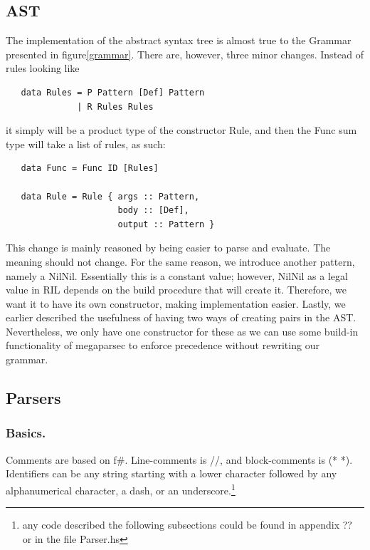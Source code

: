 \documentclass[a4paper]{article}
\begin{document}
\subsection{AST}
\label{sec:org0b11442}
The implementation of the abstract syntax tree is almost true to the Grammar presented in figure\ref{grammar}. There are, however, three minor changes. Instead of rules looking like
\begin{verbatim}
   data Rules = P Pattern [Def] Pattern
              | R Rules Rules
\end{verbatim}
it simply will be a product type of the constructor Rule, and then the Func sum type will take a list of rules, as such:
\begin{verbatim}
   data Func = Func ID [Rules]

   data Rule = Rule { args :: Pattern,
                      body :: [Def],
                      output :: Pattern }
\end{verbatim}
This change is mainly reasoned by being easier to parse and evaluate. The meaning should not change.
For the same reason, we introduce another pattern, namely a NilNil. Essentially this is a constant value; however, NilNil as a legal value in RIL depends on the build procedure that will create it. Therefore, we want it to have its own constructor, making implementation easier.
Lastly, we earlier described the usefulness of having two ways of creating pairs in the AST. Nevertheless, we only have one constructor for these as we can use some build-in functionality of megaparsec to enforce precedence without rewriting our grammar.
\subsection{Parsers}
\label{sec:orgfb198d0}
\subsubsection{Basics.}
\label{sec:org05f8e66}
Comments are based on f\#. Line-comments is //, and block-comments is (* *). Identifiers can be any string starting with a lower character followed by any alphanumerical character, a dash, or an underscore.\footnote{any code described the following subsections could be found in appendix ?? or in the file Parser.hs}
\end{document}
